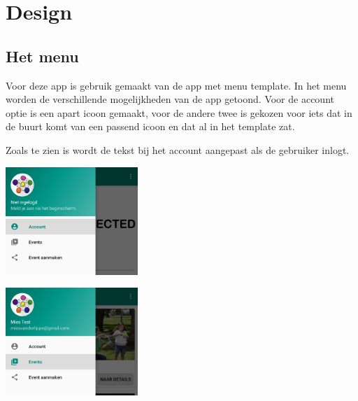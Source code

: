 \documentclass[dutch]{report}
\begin{document}
	\newpage
	
	\section{Design}
	
	
	\subsection{Het menu}
	Voor deze app is gebruik gemaakt van de app met menu template. In het menu worden de verschillende 
	mogelijkheden van de app getoond. Voor de account optie is een apart icoon gemaakt, voor de andere
	twee is gekozen voor iets dat in de buurt komt van een passend icoon en dat al in het template zat. 
	
	Zoals te zien is wordt de tekst bij het account aangepast als de gebruiker inlogt. 
	
	\begin{minipage}{0.50\textwidth}
		\begin{center}
			\includegraphics[width=5cm]{images/nietingelogd.png}		
		\end{center}
	\end{minipage}
	\hfill
	\begin{minipage}{0.50\textwidth}
		\begin{center}
			\includegraphics[width=5cm]{images/ingelogd.png}
		\end{center}
	\end{minipage}
	
\end{document}
